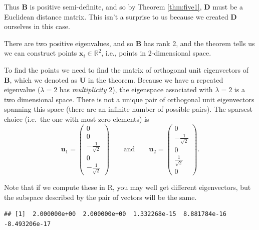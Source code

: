 \documentclass[
]{book}
\newenvironment{Shaded}{\begin{snugshade}}{\end{snugshade}}
\newcommand{\CommentTok}[1]{\textcolor[rgb]{0.56,0.35,0.01}{\textit{#1}}}
\newcommand{\DecValTok}[1]{\textcolor[rgb]{0.00,0.00,0.81}{#1}}
\newcommand{\FunctionTok}[1]{\textcolor[rgb]{0.13,0.29,0.53}{\textbf{#1}}}
\newcommand{\NormalTok}[1]{#1}
\newcommand{\SpecialCharTok}[1]{\textcolor[rgb]{0.81,0.36,0.00}{\textbf{#1}}}
\theoremstyle{definition}
\theoremstyle{definition}
\theoremstyle{definition}
\theoremstyle{definition}
\theoremstyle{remark}
\begin{document}
Thus \(\mathbf B\) is positive semi-definite, and so
by Theorem \ref{thm:five1}, \(\mathbf D\) must be a Euclidean distance matrix. This isn't a surprise to us because we created \(\mathbf D\) ourselves in this case.

There are two positive eigenvalues, and so \(\mathbf B\) has rank 2, and the theorem tells us we can construct points \(\mathbf x_i \in \mathbb{R}^2\), i.e., points in 2-dimensional space.

To find the points we need to find the matrix of orthogonal unit eigenvectors of \(\mathbf B\), which we denoted as \(\mathbf U\) in the theorem.
Because we have a repeated eigenvalue (\(\lambda=2\) has \emph{multiplicity} 2), the eigenspace associated with \(\lambda=2\) is a two dimensional space.
There is not a unique pair of orthogonal unit eigenvectors spanning this space (there are an infinite number of possible pairs).
The sparsest choice (i.e.~the one with most zero elements) is
\[
\mathbf u_1= \begin{pmatrix}0 \\ 0 \\ -\frac{1}{\sqrt{2}} \\ 0 \\ -\frac{1}{\sqrt{2}} \end{pmatrix} \qquad
\text{and} \qquad \mathbf u_2 =\begin{pmatrix}0 \\ -\frac{1}{\sqrt{2}} \\ 0 \\ \frac{1}{\sqrt{2}}\\ 0 \end{pmatrix}.
\]

Note that if we compute these in R, you may well get different eigenvectors, but the subspace described by the pair of vectors will be the same.

\begin{Shaded}
\end{Shaded}

\begin{verbatim}
## [1]  2.000000e+00  2.000000e+00  1.332268e-15  8.881784e-16 -8.493206e-17
\end{verbatim}

\begin{Shaded}
\end{Shaded}
\end{document}
